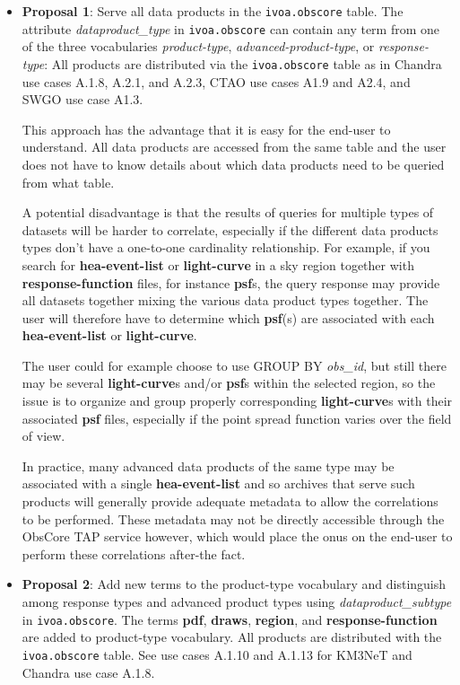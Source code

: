 \begin{itemize} 
\item {\bf Proposal 1}: Serve all data products in the {\tt ivoa.obscore} table.  The attribute {\em dataproduct\_type\/} in {\tt ivoa.obscore} can contain any term from one of the three vocabularies  \textsl{product-type}, \textsl{advanced-product-type},  or \textsl{response-type}: 
All products are distributed via the {\tt ivoa.obs\-core} table as in 
Chandra use cases A.1.8, A.2.1, and A.2.3, CTAO use cases A1.9 and A2.4, and SWGO use case A1.3.

This approach has the advantage that it is easy for the end-user to understand.  All data products are accessed from the same table and the user does not have to know details about which data products need to be queried from what table.

A potential disadvantage is that the results of queries for multiple types of datasets will be harder to correlate, especially if the different data products types don't have a one-to-one cardinality relationship.  For example, if you search for  {\bf hea-event-list} or {\bf light-curve} in a sky region together with {\bf response-function} files, for instance {\bf psf}s, the query response may provide all datasets together mixing the various data product types together.  The user will therefore have to determine which {\bf psf}(s) are associated with each {\bf hea-event-list} or {\bf light-curve}.

The user could for example choose to use GROUP BY {\em obs\_id\/}, but still there may be several {\bf light-curve}s and/or {\bf psf}s within the selected region, so the issue is to organize and group properly corresponding {\bf light-curve}s with their associated {\bf psf} files, especially if the point spread function varies over the field of view.

In practice, many advanced data products of the same type may be associated with a single {\bf hea-event-list} and so archives that serve such products will generally provide adequate metadata to allow the correlations to be performed.  These metadata may not be directly accessible through the ObsCore TAP service however, which would place the onus on the end-user to perform these correlations after-the fact.

\item {\bf Proposal 2}: Add new terms to the product-type vocabulary and distinguish among response types and advanced product types using {\em data\-product\_subtype\/} in {\tt ivoa.obscore}. 
The terms {\bf pdf}, {\bf draws}, {\bf region}, and {\bf response-function} are added to product-type vocabulary. 
All products are distributed with the {\tt ivoa.obscore} table.
See use cases A.1.10 and A.1.13 for KM3NeT and Chandra use case A.1.8.


\end{itemize}
